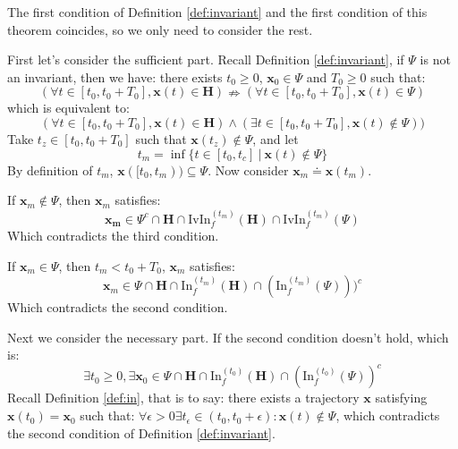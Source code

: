 \documentclass{article}
\begin{document}
\begin{Proof}
The first condition of Definition \ref{def:invariant} and the first condition of this theorem coincides, so we only need to consider the rest.

First let's consider the sufficient part. Recall Definition \ref{def:invariant}, if $\Psi$ is not an invariant, then we have: there exists $t_0 \geq 0$, $\boldsymbol{x}_0 \in \Psi$ and $T_0 \geq 0$ such that:
\begin{equation*}
	(\forall t \in [t_0, t_0 + T_0], \boldsymbol{x}(t) \in \boldsymbol{H}) \nRightarrow (\forall t \in [t_0, t_0 + T_0], \boldsymbol{x}(t) \in \Psi)
\end{equation*}
which is equivalent to:
\begin{equation*}
	(\forall t \in [t_0, t_0 + T_0], \boldsymbol{x}(t) \in \boldsymbol{H}) \wedge (\exists t \in [t_0, t_0 + T_0], \boldsymbol{x}(t) \notin \Psi))
\end{equation*}
Take $t_z \in [t_0, t_0 + T_0]$ such that $\boldsymbol{x}(t_z) \notin \Psi$, and let
\begin{equation*}
	t_m = \inf \{ t \in [t_0, t_c]\ |\ \boldsymbol{x}(t) \notin \Psi \}
\end{equation*}
By definition of $t_m$, $\boldsymbol{x}([t_0, t_m)) \subseteq \Psi$. Now consider $\boldsymbol{x}_m \doteq \boldsymbol{x}(t_m)$.

 If $\boldsymbol{x}_m \notin \Psi$, then $\boldsymbol{x}_m$ satisfies:
\begin{equation*}
	\boldsymbol{x_m} \in \Psi^c \cap \boldsymbol{H} \cap \mathrm{IvIn}_f^{(t_m)}(\boldsymbol{H}) \cap \mathrm{IvIn}_f^{(t_m)}(\Psi)
\end{equation*}
Which contradicts the third condition.

If $\boldsymbol{x}_m \in \Psi$, then $t_m < t_0 + T_0$, $\boldsymbol{x}_m$ satisfies:
\begin{equation*}
	\boldsymbol{x}_m \in \Psi \cap \boldsymbol{H} \cap \mathrm{In}_f^{(t_m)}(\boldsymbol{H}) \cap (\mathrm{In}_f^{(t_m)}(\Psi)))^c
\end{equation*}
Which contradicts the second condition.

Next we consider the necessary part. If the second condition doesn't hold, which is:
\begin{equation*}
	\exists t_0 \geq 0 ,\exists \boldsymbol{x}_0 \in \Psi \cap \boldsymbol{H} \cap \mathrm{In}_f^{(t_0)}(\boldsymbol{H}) \cap (\mathrm{In}_f^{(t_0)}(\Psi))^c
\end{equation*}
Recall Definition \ref{def:in}, that is to say: there exists a trajectory $\boldsymbol{x}$ satisfying $\boldsymbol{x}(t_0) = \boldsymbol{x}_0$ such that: $\forall \epsilon > 0 \exists t_{\epsilon} \in (t_0, t_0 + \epsilon) : \boldsymbol{x}(t) \notin \Psi$, which contradicts the second condition of Definition \ref{def:invariant}.


\end{Proof}
\end{document}
